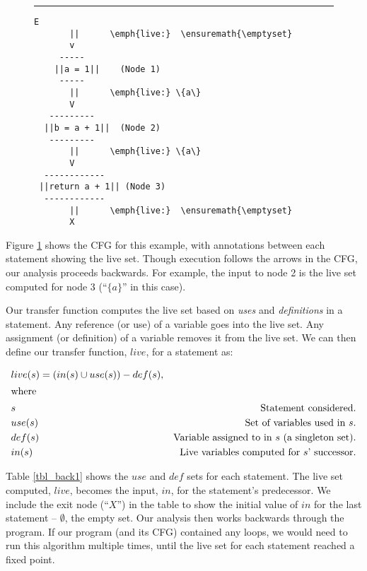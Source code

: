 \documentclass[12pt]{report}
\begin{document}
\begin{figure}[th]\centering
\rule{\linewidth-}{0.4pt}
\begin{Verbatim}[commandchars=\\\{\}]
       E
       ||      \emph{live:}  \ensuremath{\emptyset}
       v
     -----
    ||a = 1||    (Node 1)
     -----
       ||      \emph{live:} \{a\}
       V
   ---------
  ||b = a + 1||  (Node 2)
   ---------
       ||      \emph{live:} \{a\}
       V
  ------------
 ||return a + 1|| (Node 3)
  ------------
       ||      \emph{live:}  \ensuremath{\emptyset}
       X
\end{Verbatim}
\caption{}
\label{fig_back3}
\end{figure}

Figure \ref{fig_back3} shows the CFG for this example, with annotations
between each statement showing the live set. Though
execution follows the arrows in the CFG, our analysis proceeds
backwards. For example, the input to node 2 is the live set computed
for node 3 (``$\{a\}$'' in this case).

Our transfer function computes the live set based on \emph{uses} and
\emph{definitions} in a statement. Any reference (or use) of a
variable goes into the live set. Any assignment (or definition) of a
variable removes it from the live set. We can then define our transfer
function, $live$, for a statement as:

\begin{align}
  & live(s) = (in(s) \cup use(s)) - def(s), \label{eqn_back1} \\
\intertext{where}
  & s     & \text{Statement considered.} \notag\\
  & use(s) &  \text{Set of variables used in $s$}. \notag\\
  & def(s) & \text{Variable assigned to in $s$ (a singleton set)}. \notag\\
  & in(s) & \text{Live variables computed for $s$' successor}. \notag
\end{align}

Table \ref{tbl_back1} shows the $use$ and $def$ sets for each
statement. The live set computed, $live$, becomes the input, $in$, for
the statement's predecessor. We include the exit node (``$X$'') in the
table to show the initial value of $in$ for the last statement --
$\emptyset$, the empty set. Our analysis then works backwards through the
program. If our program (and its CFG) contained any loops, we would
need to run this algorithm multiple times, until the live set for each
statement reached a fixed point.
\end{document}
